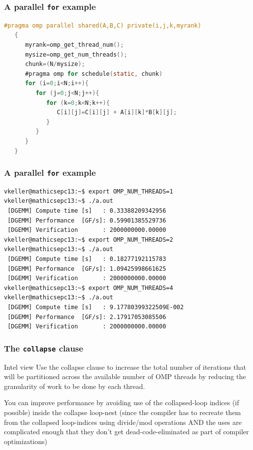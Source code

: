 \begin{frame}[containsverbatim]
\frametitle{A parallel \texttt{for} example}
\begin{lstlisting}[language=C,frame=lines]
   #pragma omp parallel shared(A,B,C) private(i,j,k,myrank)
   {
      myrank=omp_get_thread_num();
      mysize=omp_get_num_threads();
      chunk=(N/mysize);
      #pragma omp for schedule(static, chunk)
      for (i=0;i<N;i++){
         for (j=0;j<N;j++){
            for (k=0;k<N;k++){
               C[i][j]=C[i][j] + A[i][k]*B[k][j];
            }
         }
      }
   }
\end{lstlisting}
\end{frame}

\begin{frame}[containsverbatim]
\frametitle{A parallel \texttt{for} example}

\begin{verbatim}
vkeller@mathicsepc13:~$ export OMP_NUM_THREADS=1
vkeller@mathicsepc13:~$ ./a.out
 [DGEMM] Compute time [s]   : 0.33388209342956
 [DGEMM] Performance  [GF/s]: 0.59901385529736
 [DGEMM] Verification       : 2000000000.00000
vkeller@mathicsepc13:~$ export OMP_NUM_THREADS=2
vkeller@mathicsepc13:~$ ./a.out
 [DGEMM] Compute time [s]   : 0.18277192115783
 [DGEMM] Performance  [GF/s]: 1.09425998661625
 [DGEMM] Verification       : 2000000000.00000
vkeller@mathicsepc13:~$ export OMP_NUM_THREADS=4
vkeller@mathicsepc13:~$ ./a.out
 [DGEMM] Compute time [s]   : 9.17780399322509E-002
 [DGEMM] Performance  [GF/s]: 2.17917053085506
 [DGEMM] Verification       : 2000000000.00000
\end{verbatim}

\end{frame}




\begin{frame}
\frametitle{The \texttt{collapse} clause}

\begin{block}{Intel view}
Use the collapse clause to increase the total number of iterations that will be partitioned across the available number of OMP threads by reducing the granularity of work to be done by each thread.

You can improve performance by avoiding use of the collapsed-loop indices (if possible) inside the collapse loop-nest (since the compiler has to recreate them from the collapsed loop-indices using divide/mod operations AND the uses are complicated enough that they don't get dead-code-eliminated as part of compiler optimizations)
\end{block}

\end{frame}

